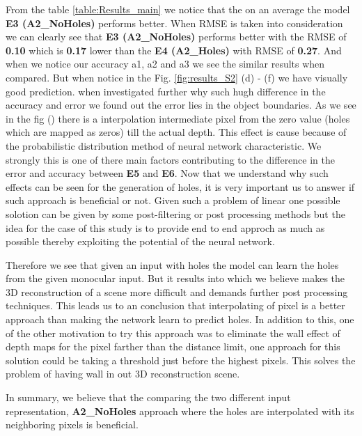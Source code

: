 From the table \ref{table:Results_main} we notice that the on an average the model \textbf{E3 (A2\_NoHoles)} performs better. When RMSE is taken into consideration we can clearly see that \textbf{E3 (A2\_NoHoles)} performs better with the RMSE of \textbf{0.10} which is \textbf{0.17} lower than the \textbf{E4 (A2\_Holes)} with RMSE of \textbf{0.27}. And when we notice our accuracy a1, a2 and a3 we see the similar results when compared. But when notice in the Fig. \ref{fig:results_S2} (d) - (f) we have visually good prediction. when investigated further why such hugh difference in the accuracy and error we found out the error lies in the object boundaries. As we see in the fig () there is a interpolation intermediate pixel from the zero value (holes which are mapped as zeros) till the actual depth. This effect is cause because of the probabilistic distribution method of neural network characteristic. We strongly this is one of there main factors contributing to the difference in the error and accuracy between \textbf{E5} and \textbf{E6}. Now that we understand why such effects can be seen for the generation of holes, it is very important us to answer if such approach is beneficial or not. Given such a problem of linear  one possible solotion can be given by some post-filtering or post processing methods but the idea for the case of this study is to provide end to end approch as much as possible thereby exploiting the potential of the neural network. 

Therefore we see that given an input with holes the model can learn the holes from the given monocular input. But it results into  which we believe makes the 3D reconstruction of a scene more difficult and demands further post processing techniques. This leads us to an conclusion that interpolating of pixel is a better approach than making the network learn to predict holes. In addition to this, one of the other motivation to try this approach was to eliminate the wall effect of depth maps  for the pixel farther than the distance limit, one approach for this solution could be taking a threshold just before the highest pixels. This solves the problem of having wall in out 3D reconstruction scene.

In summary, we believe that the comparing the two different input representation, \textbf{A2\_NoHoles} approach where the holes are interpolated with its neighboring pixels is beneficial.





